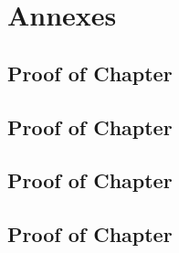 \chapter[Annexes]{Annexes}

\localtableofcontents



\section{Proof of Chapter }

\section{Proof of Chapter }

\section{Proof of Chapter }

\section{Proof of Chapter }
